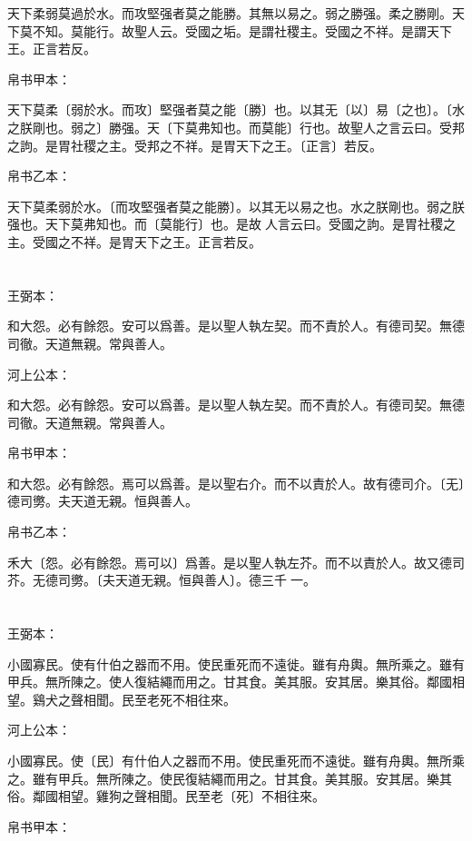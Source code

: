 \documentclass[a5paper]{ctexbook}
\begin{document}
    天下柔弱莫過於水。而攻堅强者莫之能勝。其無以易之。弱之勝强。柔之勝剛。天下莫不知。莫能行。故聖人云。受國之垢。是謂社稷主。受國之不祥。是謂天下王。正言若反。

    帛书甲本：

    天下莫柔〔弱於水。而攻〕堅强者莫之能〔勝〕也。以其无〔以〕易〔之也〕。〔水之朕剛也。弱之〕勝强。天〔下莫弗知也。而莫能〕行也。故聖人之言云曰。受邦之訽。是胃社稷之主。受邦之不祥。是胃天下之王。〔正言〕若反。

    帛书乙本：

    天下莫柔弱於水。〔而攻堅强者莫之能勝〕。以其无以易之也。水之朕剛也。弱之朕强也。天下莫弗知也。而〔莫能行〕也。是故𦔻人言云曰。受國之訽。是胃社稷之主。受國之不祥。是胃天下之王。正言若反。

    \chapter{}
    王弼本：

    和大怨。必有餘怨。安可以爲善。是以聖人執左契。而不責於人。有德司契。無德司徹。天道無親。常與善人。

    河上公本：

    和大怨。必有餘怨。安可以爲善。是以聖人執左契。而不責於人。有德司契。無德司徹。天道無親。常與善人。

    帛书甲本：

    和大怨。必有餘怨。焉可以爲善。是以聖右介。而不以責於人。故有德司介。〔无〕德司勶。夫天道无親。恒與善人。

    帛书乙本：

    禾大〔怨。必有餘怨。焉可以〕爲善。是以聖人執左芥。而不以責於人。故又德司芥。无德司勶。〔夫天道无親。恒與善人〕。德三千𠦜一。

    \chapter{}
    王弼本：

    小國寡民。使有什伯之器而不用。使民重死而不遠徙。雖有舟輿。無所乘之。雖有甲兵。無所陳之。使人復結繩而用之。甘其食。美其服。安其居。樂其俗。鄰國相望。鷄犬之聲相聞。民至老死不相往來。

    河上公本：

    小國寡民。使〔民〕有什伯人之器而不用。使民重死而不遠徙。雖有舟輿。無所乘之。雖有甲兵。無所陳之。使民復結繩而用之。甘其食。美其服。安其居。樂其俗。鄰國相望。雞狗之聲相聞。民至老〔死〕不相往來。

    帛书甲本：
\end{document}
